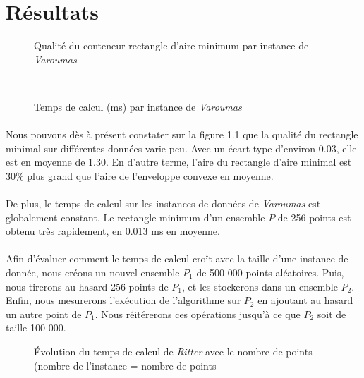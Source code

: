 \documentclass[a4paper, 12pt]{report}
\begin{document}
\section{Résultats}

\begin{figure}[htbp]
\centering
\begin{minipage}[t]{0.47
\textwidth}
\def\svgscale{0.45}

\caption{Qualité du conteneur rectangle d'aire minimum par instance de \emph{Varoumas}}
\end{minipage}
\hfill
\begin{minipage}[t]{0.47\textwidth}
   \
\def\svgscale{0.45}

\caption{Temps de calcul (ms) par instance de \emph{Varoumas}}
\end{minipage}
\end{figure}

\paragraph{}
Nous pouvons dès à présent constater sur la figure 1.1 que la qualité du rectangle minimal sur différentes données varie peu. Avec un écart type d'environ 0.03, elle est en moyenne de 1.30. En d'autre terme, l'aire du rectangle d'aire minimal est $30\%$ plus grand que l'aire de l'enveloppe convexe en moyenne.
\paragraph{}

De plus, le temps de calcul sur les instances de données de \emph{Varoumas} est globalement constant. Le rectangle minimum d'un ensemble $P$ de 256 points est obtenu très rapidement, en 0.013 ms en moyenne.

\paragraph{}
Afin d'évaluer comment le temps de calcul croît avec la taille d'une instance de donnée, nous créons un nouvel ensemble $P_1$ de 500 000 points aléatoires. Puis, nous tirerons au hasard 256 points de $P_1$, et les stockerons dans un ensemble $P_2$. Enfin, nous mesurerons l’exécution de l'algorithme sur $P_2$ en ajoutant au hasard un autre point de $P_1$. Nous réitérerons ces opérations jusqu'à ce que $P_2$ soit de taille 100 000. \\

\begin{figure}[htbp]
\centering
\begin{minipage}[t]{0.47
\textwidth}
\def\svgscale{0.45}


\caption{Évolution du temps de calcul de \emph{Ritter} avec le nombre de points (nombre de l'instance = nombre de points}

\end{minipage}
\end{figure}
\end{document}
